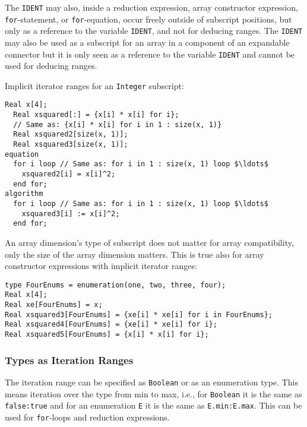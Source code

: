 The \lstinline!IDENT! may also, inside a reduction expression, array constructor expression, \lstinline!for!-statement, or \lstinline!for!-equation, occur freely outside of subscript positions, but only as a reference to the variable \lstinline!IDENT!, and not for deducing ranges.
The \lstinline!IDENT! may also be used as a subscript for an array in a component of an expandable connector but it is only seen as a reference to the variable \lstinline!IDENT! and cannot be used for deducing ranges.

\begin{example}
Implicit iterator ranges for an \lstinline!Integer! subscript:
\begin{lstlisting}[language=modelica]
  Real x[4];
  Real xsquared[:] = {x[i] * x[i] for i};
  // Same as: {x[i] * x[i] for i in 1 : size(x, 1)}
  Real xsquared2[size(x, 1)];
  Real xsquared3[size(x, 1)];
equation
  for i loop // Same as: for i in 1 : size(x, 1) loop $\ldots$
    xsquared2[i] = x[i]^2;
  end for;
algorithm
  for i loop // Same as: for i in 1 : size(x, 1) loop $\ldots$
    xsquared3[i] := x[i]^2;
  end for;
\end{lstlisting}
\end{example}

\begin{example}
An array dimension's type of subscript does not matter for array compatibility, only the size of the array dimension matters.
This is true also for array constructor expressions with implicit iterator ranges:
\begin{lstlisting}[language=modelica]
type FourEnums = enumeration(one, two, three, four);
Real x[4];
Real xe[FourEnums] = x;
Real xsquared3[FourEnums] = {xe[i] * xe[i] for i in FourEnums};
Real xsquared4[FourEnums] = {xe[i] * xe[i] for i};
Real xsquared5[FourEnums] = {x[i] * x[i] for i};
\end{lstlisting}
\end{example}

\subsubsection{Types as Iteration Ranges}\label{types-as-iteration-ranges}

The iteration range can be specified as \lstinline!Boolean! or as an enumeration type.
This means iteration over the type from min to max, i.e., for \lstinline!Boolean! it is the same as \lstinline!false:true! and for an enumeration \lstinline!E! it is the same as \lstinline!E.min:E.max!.
This can be used for \lstinline!for!-loops and reduction expressions.

